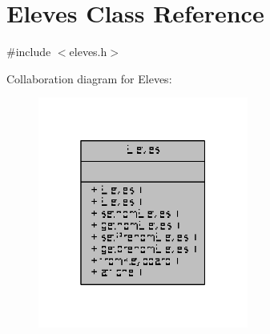 \hypertarget{class_eleves}{\section{Eleves Class Reference}
\label{class_eleves}
}


{\ttfamily \#include $<$eleves.\+h$>$}



Collaboration diagram for Eleves\+:\nopagebreak
\begin{figure}[H]
\begin{center}
\leavevmode
\includegraphics[width=196pt]{class_eleves__coll__graph}
\end{center}
\end{figure}
